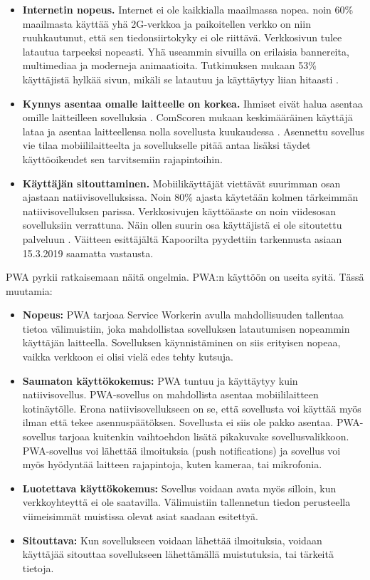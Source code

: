 \documentclass{tktltiki}
\begin{document}
\begin{itemize}
  \item \textbf{Internetin nopeus.} Internet ei ole kaikkialla maailmassa nopea. noin 60\% maailmasta käyttää yhä 2G-verkkoa \cite{Kapoor} ja paikoitellen verkko on niin ruuhkautunut, että sen tiedonsiirtokyky ei ole riittävä. Verkkosivun tulee latautua tarpeeksi nopeasti. Yhä useammin sivuilla on erilaisia bannereita, multimediaa ja moderneja animaatioita. Tutkimuksen mukaan 53\% käyttäjistä hylkää sivun, mikäli se latautuu ja käyttäytyy liian hitaasti \cite{Kapoor}.
  \item \textbf{Kynnys asentaa omalle laitteelle on korkea.} Ihmiset eivät halua asentaa omille laitteilleen sovelluksia \cite{Kapoor}. ComScoren mukaan keskimääräinen käyttäjä lataa ja asentaa laitteellensa nolla sovellusta kuukaudessa \cite{Perez}. Asennettu sovellus vie tilaa mobiililaitteelta ja sovellukselle pitää antaa lisäksi täydet käyttöoikeudet sen tarvitsemiin rajapintoihin.
  \item \textbf{Käyttäjän sitouttaminen.} Mobiilikäyttäjät viettävät suurimman osan ajastaan natiivisovelluksissa. Noin 80\% ajasta käytetään kolmen tärkeimmän natiivisovelluksen parissa. Verkkosivujen käyttöäaste on noin viidesosan sovelluksiin verrattuna. Näin ollen suurin osa käyttäjistä ei ole sitoutettu palveluun \cite{Kapoor}. Väitteen esittäjältä Kapoorilta pyydettiin tarkennusta asiaan 15.3.2019 saamatta vastausta.
\end{itemize}

PWA pyrkii ratkaisemaan näitä ongelmia. PWA:n käyttöön on useita syitä. Tässä muutamia:

\begin{itemize}
  \item \textbf{Nopeus:} PWA tarjoaa Service Workerin avulla mahdollisuuden tallentaa tietoa välimuistiin, joka mahdollistaa sovelluksen latautumisen nopeammin käyttäjän laitteella. Sovelluksen käynnistäminen on siis erityisen nopeaa, vaikka verkkoon ei olisi vielä edes tehty kutsuja.
  \item \textbf{Saumaton käyttökokemus:} PWA tuntuu ja käyttäytyy kuin natiivisovellus. PWA-sovellus on mahdollista asentaa mobiililaitteen kotinäytölle. Erona natiivisovellukseen on se, että sovellusta voi käyttää myös ilman että tekee asennuspäätöksen. Sovellusta ei siis ole pakko asentaa. PWA-sovellus tarjoaa kuitenkin vaihtoehdon lisätä pikakuvake sovellusvalikkoon. PWA-sovellus voi lähettää ilmoituksia (push notifications) ja sovellus voi myös hyödyntää laitteen rajapintoja, kuten kameraa, tai mikrofonia. 
  \item \textbf{Luotettava käyttökokemus:} Sovellus voidaan avata myös silloin, kun verkkoyhteyttä ei ole saatavilla. Välimuistiin tallennetun tiedon perusteella viimeisimmät muistissa olevat asiat saadaan esitettyä. 
  \item \textbf{Sitouttava:} Kun sovellukseen voidaan lähettää ilmoituksia, voidaan käyttäjää sitouttaa sovellukseen lähettämällä muistutuksia, tai tärkeitä tietoja. 
\end{itemize}
\end{document}

